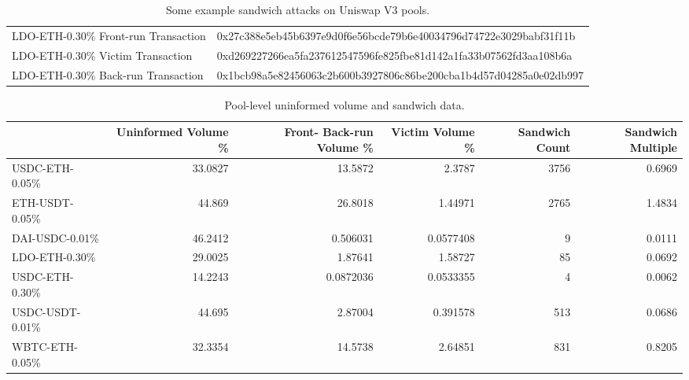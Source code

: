 \begin{table}[h]
\begin{center}
\begin{tabular}{ll}
         {\footnotesize LDO-ETH-0.30\% Front-run Transaction}  & {\tiny 0x27c388e5eb45b6397e9d0f6e56bcde79b6e40034796d74722e3029babf31f11b} \\
         {\footnotesize LDO-ETH-0.30\% Victim Transaction}     & {\tiny 0xd269227266ea5fa237612547596fe825fbe81d142a1fa33b07562fd3aa108b6a} \\
         {\footnotesize LDO-ETH-0.30\% Back-run Transaction}   & {\tiny 0x1bcb98a5e82456063c2b600b3927806c86be200cba1b4d57d04285a0e02db997} \\
        \hline
        \end{tabular}
        \caption{Some example sandwich attacks on Uniswap V3 pools.}
        \label{Tab:sandwiches}
    \end{center}
\end{table}

\begin{table}[h]
    \begin{center}
        \begin{tabular}{lrrrrr}
        \hline
           &   {\tiny Uninformed Volume \%} &   {\tiny  Front- Back-run Volume \%} &   {\tiny Victim Volume \%} &   {\tiny Sandwich Count} &   {\tiny Sandwich Multiple} \\
        \hline
         {\footnotesize USDC-ETH-0.05\%} &               33.0827 &                 13.5872    &         2.3787    &             3756 &              0.6969 \\
         {\footnotesize ETH-USDT-0.05\%} &               44.869  &                 26.8018    &         1.44971   &             2765 &              1.4834 \\
         {\footnotesize DAI-USDC-0.01\%} &               46.2412 &                  0.506031  &         0.0577408 &                9 &              0.0111 \\
         {\footnotesize LDO-ETH-0.30\%}  &               29.0025 &                  1.87641   &         1.58727   &               85 &              0.0692 \\
         {\footnotesize USDC-ETH-0.30\%} &               14.2243 &                  0.0872036 &         0.0533355 &                4 &              0.0062 \\
         {\footnotesize USDC-USDT-0.01\%}  &               44.695 &                  2.87004   &         0.391578   &               513 &              0.0686 \\
         {\footnotesize WBTC-ETH-0.05\%} &               32.3354 &                 14.5738    &         2.64851   &              831 &              0.8205 \\
        \hline
        \end{tabular}
        \caption{Pool-level uninformed volume and sandwich data.}
    \end{center}
\end{table}

